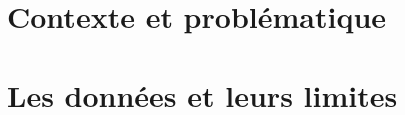 \documentclass[12pt,a4paper]{report}
\begin{document}





\part{Contexte et problématique}
\label{part:contexte}

\part{Les données et leurs limites}
\label{part:donnees}
\end{document}
